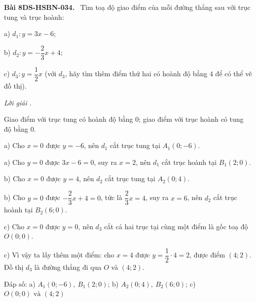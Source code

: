 \documentclass[12pt,a4paper]{article}
\newenvironment{problem}[1][]{\par\medskip\noindent\textbf{Bài #1.}\ }{\par}
\newenvironment{solution}[1][]{\par\noindent\textit{Lời giải #1.}\par}{\par}
\begin{document}
\begin{problem}[8DS-HSBN-034]
Tìm toạ độ giao điểm của mỗi đường thẳng sau với trục tung và trục hoành:

a) $d_1\colon y = 3x - 6$;

b) $d_2\colon y = -\dfrac{2}{3}x + 4$;

c) $d_3\colon y = \dfrac{1}{2}x$ (với $d_3$, hãy tìm thêm điểm thứ hai có hoành độ bằng $4$ để có thể vẽ đồ thị).

\begin{solution}
Giao điểm với trục tung có hoành độ bằng $0$; giao điểm với trục hoành có tung độ bằng $0$.

a) Cho $x = 0$ được $y = -6$, nên $d_1$ cắt trục tung tại $A_1(0; -6)$.

a) Cho $y = 0$ được $3x - 6 = 0$, suy ra $x = 2$, nên $d_1$ cắt trục hoành tại $B_1(2; 0)$.

b) Cho $x = 0$ được $y = 4$, nên $d_2$ cắt trục tung tại $A_2(0; 4)$.

b) Cho $y = 0$ được $-\dfrac{2}{3}x + 4 = 0$, tức là $\dfrac{2}{3}x = 4$, suy ra $x = 6$, nên $d_2$ cắt trục hoành tại $B_2(6; 0)$.

c) Cho $x = 0$ được $y = 0$, nên $d_3$ cắt cả hai trục tại cùng một điểm là gốc toạ độ $O(0; 0)$.

c) Vì vậy ta lấy thêm một điểm: cho $x = 4$ được $y = \dfrac{1}{2} \cdot 4 = 2$, được điểm $(4; 2)$. Đồ thị $d_3$ là đường thẳng đi qua $O$ và $(4; 2)$.

Đáp số: a) $\boxed{A_1(0; -6),\ B_1(2; 0)}$; b) $\boxed{A_2(0; 4),\ B_2(6; 0)}$; c) $\boxed{O(0; 0) \text{ và } (4; 2)}$
\end{solution}
\end{problem}
\end{document}
